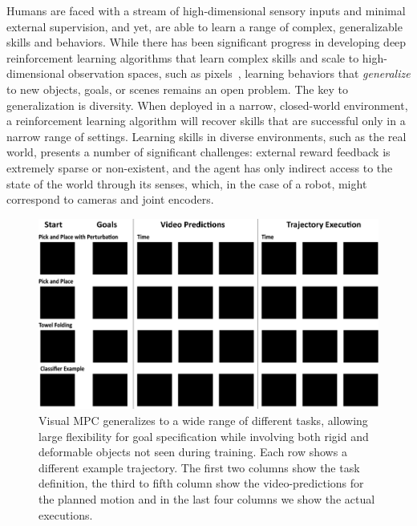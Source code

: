 
Humans are faced with a stream of high-dimensional sensory inputs and minimal external supervision, and yet, are able to learn a range of complex, generalizable skills and behaviors.
While there has been significant progress in developing deep reinforcement learning algorithms that learn complex skills and scale to high-dimensional observation spaces, such as pixels~\cite{tdgammon,atari,e2e,alphago}, learning behaviors that \emph{generalize} to new objects, goals, or scenes remains an open problem.
The key to generalization is diversity. When deployed in a narrow, closed-world environment, a reinforcement learning algorithm will recover skills that are successful only in a narrow range of settings. 
Learning skills in diverse  environments, such as the real world, presents a number of significant challenges: external reward feedback is extremely sparse or non-existent, and the agent has only indirect access to the state of the world through its senses, which, in the case of a robot, might correspond to cameras and joint encoders.
\begin{figure}[t]
	\centering
	\includegraphics[width=1\columnwidth,trim={0mm 0 0 0},clip]{images_general/tile_rough.png}
	\caption{Visual MPC generalizes to a wide range of different tasks, allowing large flexibility for goal specification while involving both rigid and deformable objects not seen during training. Each row shows a different example trajectory. The first two columns show the task definition, the third to fifth column show the video-predictions for the planned motion and in the last four columns we show the actual executions.}
	\label{fig:example_traj}
\end{figure}
